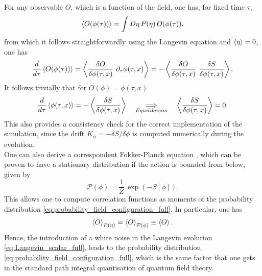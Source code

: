 For any observable $O$, which is a function of the field, one has, for fixed time $\tau$,
\begin{equation*}
    \left\langle O(\phi(\tau)) \right\rangle = \int D\eta \, P(\eta) \, O(\phi(\tau)),
\end{equation*}
from which it follows straightforwardly using the Langevin equation and $\left\langle \eta \right\rangle = 0$, one has
\begin{equation*}
    \frac{d}{d\tau} \left\langle O(\phi(\tau)) \right\rangle = \left\langle \frac{\delta O}{\delta \phi(\tau, x)} \ \partial_\tau \phi(\tau, x) \right\rangle = -\left\langle \frac{\delta O}{\delta \phi(\tau, x)} \ \frac{\delta S}{\delta \phi(\tau, x)} \right\rangle.
\end{equation*}
It follows trivially that for $O(\phi) = \phi(\tau, x)$
\begin{equation*}
        \frac{d}{d\tau} \left\langle \phi(\tau, x) \right\rangle = -\left\langle \frac{\delta S}{\delta \phi(\tau, x)} \right\rangle \quad \underset{Equilibrium}{\Longrightarrow} \quad \left\langle \frac{\delta S}{\delta \phi(\tau, x)} \right\rangle = 0.
\end{equation*}
This also provides a consistency check for the correct implementation of the simulation, since the drift $K_\phi = -\delta S / \delta \phi$ is computed numerically during the evolution. \\
One can also derive a correspondent Fokker-Planck equation \cite{gardiner}, which can be proven to have a stationary distribution if the action is bounded from below, given by \cite{Damgaard1987StochasticQuantization}
\begin{equation}
    \mathcal{P}(\phi) = \frac{1}{Z} \, \exp\left(-S[\phi]\right).
    \label{eq:probability_field_configuration_full}
\end{equation}
This allows one to compute correlation functions as moments of the  probability distribution \eqref{eq:probability_field_configuration_full}. In particular, one has 
\begin{equation}
    \left\langle O \right\rangle_{P(\eta)} = \left\langle O \right\rangle_{\mathcal{P}(\phi)} \equiv \left\langle O \right\rangle.
    \label{eq:expectation_observables}
\end{equation}
Hence, the introduction of a white noise in the Langevin evolution \eqref{eq:Langevin_scalar_full}, leads to the probability distribution \eqref{eq:probability_field_configuration_full}, which is the same factor that one gets in the standard path integral quantisation of quantum field theory.

